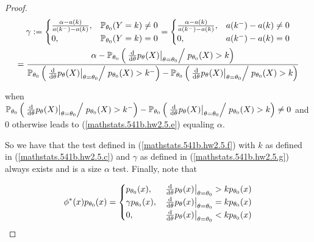 \begin{proof}
\begin{multline}\label{mathstats.541b.hw2.5.g}
\gamma := \begin{cases}
 \frac{\alpha - a(k)}{a(k^-) - a(k)}, & \mathbb{P}_{\theta_0} ( Y = k) \neq 0 \\
 0, &  \mathbb{P}_{\theta_0}( Y = k) = 0
 \end{cases} = \begin{cases}
 \frac{\alpha - a(k)}{a(k^-) - a(k)}, & a(k^-) - a(k) \neq 0 \\
 0, & a(k^-) - a(k) = 0
 \end{cases}
 \\ =
\frac{\alpha -     \mathbb{P}_{\theta_0} \left(  \left. \left.  \deriv{}{\theta} p_\theta(X) \right|_{\theta = \theta_0}  \middle/ \right.  p_{\theta_0}(X) > k \right) }{\mathbb{P}_{\theta_0} \left(  \left. \left.  \deriv{}{\theta} p_\theta(X) \right|_{\theta = \theta_0}  \middle/ \right.  p_{\theta_0}(X) > k^- \right)   -    \mathbb{P}_{\theta_0} \left(  \left. \left.  \deriv{}{\theta} p_\theta(X) \right|_{\theta = \theta_0}  \middle/ \right.  p_{\theta_0}(X) > k \right)}
\end{multline}

when \(\mathbb{P}_{\theta_0} \left(  \left. \left.  \deriv{}{\theta} p_\theta(X) \right|_{\theta = \theta_0}  \middle/ \right.  p_{\theta_0}(X) > k^- \right)   -    \mathbb{P}_{\theta_0} \left(  \left. \left.  \deriv{}{\theta} p_\theta(X) \right|_{\theta = \theta_0}  \middle/ \right.  p_{\theta_0}(X) > k \right) \neq 0\) and 0 otherwise leads to (\ref{mathstats.541b.hw2.5.e}) equaling \(\alpha\).

So we have that the test defined in (\ref{mathstats.541b.hw2.5.f}) with \(k\) as defined in (\ref{mathstats.541b.hw2.5.c}) and \(\gamma\) as defined in (\ref{mathstats.541b.hw2.5.g}) always exists and is a size \(\alpha\) test. Finally, note that

\[
 \phi^*(x)  p_{\theta_0}(x) =  \begin{cases}
p_{\theta_0}(x) , & \left. \deriv{}{\theta} p_\theta(x) \right|_{\theta = \theta_0} > k p_{\theta_0}(x)  \\
\gamma p_{\theta_0}(x) , & \left. \deriv{}{\theta} p_\theta(x) \right|_{\theta = \theta_0} = k p_{\theta_0}(x)  \\
0, & \left. \deriv{}{\theta} p_\theta(x) \right|_{\theta = \theta_0} < k p_{\theta_0}(x) 
\end{cases}
 \]


\end{proof}
